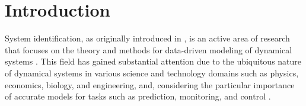 \section{Introduction} \label{sec:intro}
%
%
%
%
System identification, as originally introduced in \cite{zadeh1956identification}, is an active area of research \cite{ljung2010perspectives} that focuses on the theory and methods for data-driven modeling of dynamical systems \cite{luenberger1979dynamic}. 
This field has gained substantial attention \cite{LjungBooK2,chiuso2019system} due to the ubiquitous nature of dynamical systems in various science and technology domains such as physics, economics, biology, and engineering, and, considering the particular importance of accurate models for tasks such as prediction, monitoring, and control \cite{khansari2014learning,tang2021expectation,ferrari2012system,franco2023parameter,shastry2023system}. 
